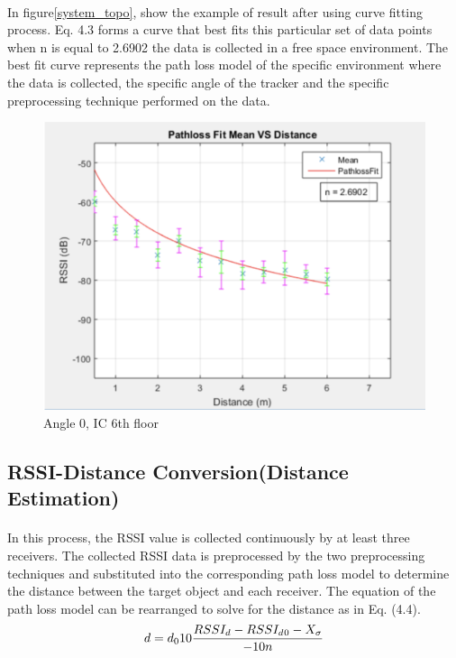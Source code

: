\paragraph{}In figure\ref{system_topo}, show the example of result after using curve fitting process. Eq. 4.3 forms a curve that best fits this particular set of data points when n is equal to 2.6902 the data is collected in a free space environment. The best fit curve represents the path loss model of the specific environment where the data is collected, the specific angle of the tracker and the specific preprocessing technique performed on the data.
\begin{figure}[h]
\centering
\includegraphics[width=\textwidth]{Image/angle0.png}
\caption{Angle 0, IC 6th floor}
\end{figure}

\newpage
\subsection{RSSI-Distance Conversion(Distance Estimation)}
\paragraph{}In this process, the RSSI value is collected continuously by at least three receivers. The collected RSSI data is preprocessed by the two preprocessing techniques and substituted into the corresponding path loss model to determine the distance between the target object and each receiver. The equation of the path loss model can be rearranged to solve for the distance as in Eq. (4.4).
\begin{equation}
d = d_010\frac{RSSI_d-RSSI_d\textsubscript{0}-X_\sigma}{-10n}
\label{fig:eqt4}
\end{equation}
